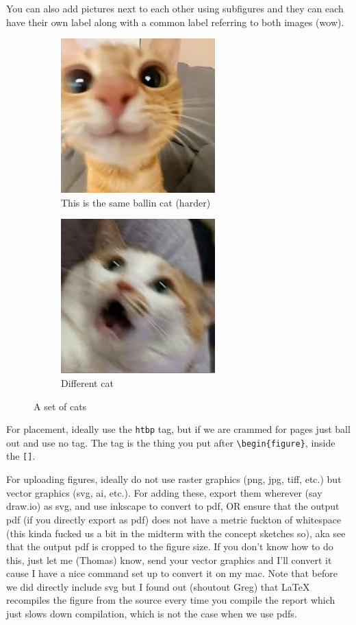 \documentclass[../main.tex]{subfiles}
\begin{document}
You can also add pictures next to each other using subfigures and they can each have their own label along with a common label referring to both images (wow). 
\begin{figure}[htbp]
\centering
\begin{subfigure}{.5\textwidth}
  \centering
  \includegraphics[width=.4\linewidth]{figures/cats/cat.png}
  \caption{This is the same ballin cat (harder)}
\end{subfigure}%
\begin{subfigure}{.5\textwidth}
  \centering
  \includegraphics[width=.4\linewidth]{figures/cats/images.jpg}
  \caption{Different cat}
\end{subfigure}
\caption{A set of cats}
\end{figure}

For placement, ideally use the \texttt{htbp} tag, but if we are crammed for pages just ball out and use no tag. The tag is the thing you put after \texttt{\textbackslash begin\{figure\}}, inside the \texttt{[]}.

For uploading figures, ideally do not use raster graphics (png, jpg, tiff, etc.) but vector graphics (svg, ai, etc.). For adding these, export them wherever (say draw.io) as svg, and use inkscape to convert to pdf, OR ensure that the output pdf (if you directly export as pdf) does not have a metric fuckton of whitespace (this kinda fucked us a bit in the midterm with the concept sketches so), aka see that the output pdf is cropped to the figure size. If you don't know how to do this, just let me (Thomas) know, send your vector graphics and I'll convert it cause I have a nice command set up to convert it on my mac. Note that before we did directly include svg but I found out (shoutout Greg) that \LaTeX{} recompiles the figure from the source every time you compile the report which just slows down compilation, which is not the case when we use pdfs.
\end{document}

